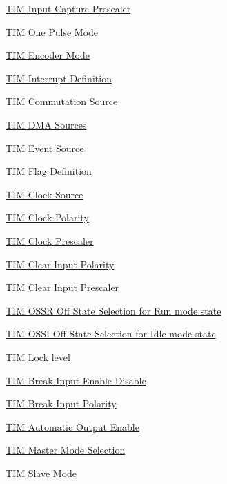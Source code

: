 \begin{DoxyCompactItemize}
\hyperlink{group___t_i_m___input___capture___prescaler}{T\+I\+M Input Capture Prescaler}
\item 
\hyperlink{group___t_i_m___one___pulse___mode}{T\+I\+M One Pulse Mode}
\item 
\hyperlink{group___t_i_m___encoder___mode}{T\+I\+M Encoder Mode}
\item 
\hyperlink{group___t_i_m___interrupt__definition}{T\+I\+M Interrupt Definition}
\item 
\hyperlink{group___t_i_m___commutation___source}{T\+I\+M Commutation Source}
\item 
\hyperlink{group___t_i_m___d_m_a__sources}{T\+I\+M D\+M\+A Sources}
\item 
\hyperlink{group___t_i_m___event___source}{T\+I\+M Event Source}
\item 
\hyperlink{group___t_i_m___flag__definition}{T\+I\+M Flag Definition}
\item 
\hyperlink{group___t_i_m___clock___source}{T\+I\+M Clock Source}
\item 
\hyperlink{group___t_i_m___clock___polarity}{T\+I\+M Clock Polarity}
\item 
\hyperlink{group___t_i_m___clock___prescaler}{T\+I\+M Clock Prescaler}
\item 
\hyperlink{group___t_i_m___clear_input___polarity}{T\+I\+M Clear Input Polarity}
\item 
\hyperlink{group___t_i_m___clear_input___prescaler}{T\+I\+M Clear Input Prescaler}
\item 
\hyperlink{group___t_i_m___o_s_s_r___off___state___selection__for___run__mode__state}{T\+I\+M O\+S\+S\+R Off State Selection for Run mode state}
\item 
\hyperlink{group___t_i_m___o_s_s_i___off___state___selection__for___idle__mode__state}{T\+I\+M O\+S\+S\+I Off State Selection for Idle mode state}
\item 
\hyperlink{group___t_i_m___lock__level}{T\+I\+M Lock level}
\item 
\hyperlink{group___t_i_m___break___input__enable__disable}{T\+I\+M Break Input Enable Disable}
\item 
\hyperlink{group___t_i_m___break___polarity}{T\+I\+M Break Input Polarity}
\item 
\hyperlink{group___t_i_m___a_o_e___bit___set___reset}{T\+I\+M Automatic Output Enable}
\item 
\hyperlink{group___t_i_m___master___mode___selection}{T\+I\+M Master Mode Selection}
\item 
\hyperlink{group___t_i_m___slave___mode}{T\+I\+M Slave Mode}

\end{DoxyCompactItemize}
